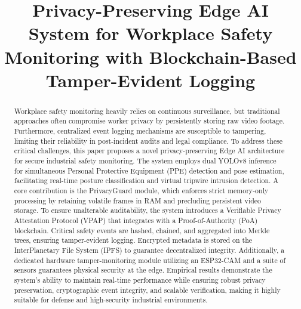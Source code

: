 \documentclass[conference]{IEEEtran}
\begin{document}
\title{Privacy-Preserving Edge AI System for Workplace Safety Monitoring with Blockchain-Based Tamper-Evident Logging}

\author{
\and
{}
\and
{}
\and
{}
}

\maketitle

\begin{abstract}
Workplace safety monitoring heavily relies on continuous surveillance, but traditional approaches often compromise worker privacy by persistently storing raw video footage. Furthermore, centralized event logging mechanisms are susceptible to tampering, limiting their reliability in post-incident audits and legal compliance. To address these critical challenges, this paper proposes a novel privacy-preserving Edge AI architecture for secure industrial safety monitoring. The system employs dual YOLOv8 inference for simultaneous Personal Protective Equipment (PPE) detection and pose estimation, facilitating real-time posture classification and virtual tripwire intrusion detection. A core contribution is the PrivacyGuard module, which enforces strict memory-only processing by retaining volatile frames in RAM and precluding persistent video storage. To ensure unalterable auditability, the system introduces a Verifiable Privacy Attestation Protocol (VPAP) that integrates with a Proof-of-Authority (PoA) blockchain. Critical safety events are hashed, chained, and aggregated into Merkle trees, ensuring tamper-evident logging. Encrypted metadata is stored on the InterPlanetary File System (IPFS) to guarantee decentralized integrity. Additionally, a dedicated hardware tamper-monitoring module utilizing an ESP32-CAM and a suite of sensors guarantees physical security at the edge. Empirical results demonstrate the system's ability to maintain real-time performance while ensuring robust privacy preservation, cryptographic event integrity, and scalable verification, making it highly suitable for defense and high-security industrial environments.
\end{abstract}
\end{document}
